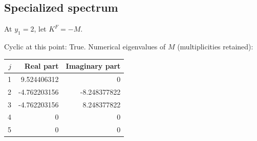 \documentclass[10pt,a4paper]{article}
\newcommand{\fitmath}[1]{\sbox{\mathbox}{$\displaystyle #1$}\ifdim\wd\mathbox>\linewidth\resizebox{\linewidth}{!}{\usebox{\mathbox}}\else\usebox{\mathbox}\fi}
\begin{document}
\subsection*{Specialized spectrum}
At $y_1=2$, let $K^F=-M$.
\begin{center}\fitmath{\Delta=59049}\end{center}
Cyclic at this point: True.
Numerical eigenvalues of $M$ (multiplicities retained):
\begin{center}\small\begin{tabular}{rrr}\toprule $j$ & Real part & Imaginary part\\\midrule
1 & 9.524406312 & 0\\
2 & -4.762203156 & -8.248377822\\
3 & -4.762203156 & 8.248377822\\
4 & 0 & 0\\
5 & 0 & 0\\
\bottomrule\end{tabular}\end{center}
\end{document}
